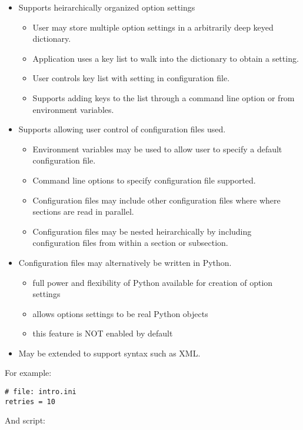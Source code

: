 \documentclass{howto}
\begin{document}
\begin{itemize}
\item Supports heirarchically organized option settings
    \begin{itemize}
    \item User may store multiple option settings in a arbitrarily deep keyed dictionary. 
    \item Application uses a key list to walk into the dictionary to obtain a setting.
    \item User controls key list with setting in configuration file.
    \item Supports adding keys to the list through a command line option or from environment variables.
    \end{itemize}
\item Supports allowing user control of configuration files used.
    \begin{itemize}
    \item Environment variables may be used to allow user to specify a default configuration file.
    \item Command line options to specify configuration file supported.
    \item Configuration files may include other configuration files where where sections are read in parallel.
    \item Configuration files may be nested heirarchically by including configuration files from within a section or subsection.
    \end{itemize}
\item Configuration files may alternatively be written in Python.
    \begin{itemize}
    \item full power and flexibility of Python available for creation of option settings
    \item allows options settings to be real Python objects
    \item this feature is NOT enabled by default
    \end{itemize}
\item May be extended to support syntax such as XML.
\end{itemize}

For example:

\begin{verbatim}
# file: intro.ini
retries = 10
\end{verbatim}

And script:
\end{document}
